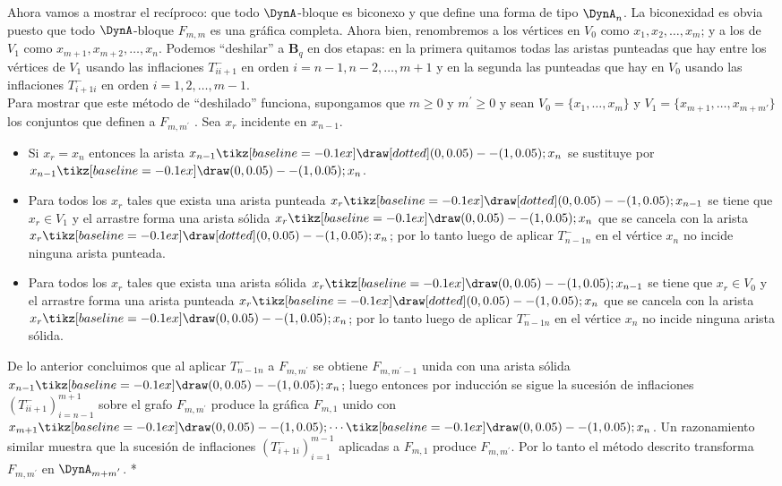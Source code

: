 \newpage
Ahora vamos a mostrar el recíproco: que todo $\DynA$-bloque es biconexo y que define una forma de tipo $\DynA_{n}$. La biconexidad es obvia puesto que todo $\DynA$-bloque $F_{m, m}$ es una gráfica completa. Ahora bien, renombremos a los vértices en $V_{0}$ como $x_{1}, x_{2}, \ldots, x_{m}$; y a los de $V_{1}$ como $x_{m+1}, x_{m+2}, \ldots, x_{n}$. Podemos “deshilar” a $\textbf{B}_{q}$ en dos etapas: en la primera quitamos todas las aristas punteadas que hay entre los vértices de $V_{1}$ usando las inflaciones $T_{i i+1}^{-}$ en orden $i = n-1, n-2, \ldots, m+1$ y en la segunda las punteadas que hay en $V_{0}$ usando las inflaciones $T_{i+1 i}^{-}$ en orden $i = 1, 2, \dots, m-1$.\\
Para mostrar que este método de “deshilado” funciona, supongamos que $m \ge 0$ y $m^{'} \ge 0$ y sean $V_{0} = \{x_{1}, \ldots, x_{m}\}$ y $V_{1} = \{x_{m+1}, \ldots, x_{m+m'}\}$ los conjuntos que definen a $F_{m,m^{'}}$ . Sea $x_{r}$ incidente en $x_{n-1}$.
\begin{itemize}
\item Si $x_{r} = x_{n}$ entonces la arista $x_{n-1} \tikz[baseline=-0.1ex]\draw [dotted] (0,0.05) -- (1,0.05); x_{n}$ se sustituye por $x_{n-1} \tikz[baseline=-0.1ex]\draw (0,0.05) -- (1,0.05); x_{n}$.
\item Para todos los $x_{r}$ tales que exista una arista punteada $x_{r} \tikz[baseline=-0.1ex]\draw [dotted] (0,0.05) -- (1,0.05); x_{n-1}$ se tiene que $x_{r} \in V_{1}$ y el arrastre forma una arista sólida $x_{r} \tikz[baseline=-0.1ex]\draw (0,0.05) -- (1,0.05); x_{n}$ que se cancela con la arista $x_{r} \tikz[baseline=-0.1ex]\draw [dotted] (0,0.05) -- (1,0.05); x_{n}$; por lo tanto luego de aplicar $T_{n-1 n}^{-}$ en el vértice $x_{n}$ no incide ninguna arista punteada.
\item Para todos los $x_{r}$ tales que exista una arista sólida $x_{r} \tikz[baseline=-0.1ex]\draw (0,0.05) -- (1,0.05); x_{n-1}$ se tiene que $x_{r} \in V_{0}$ y el arrastre forma una arista punteada $x_{r} \tikz[baseline=-0.1ex]\draw [dotted] (0,0.05) -- (1,0.05); x_{n}$ que se cancela con la arista $x_{r} \tikz[baseline=-0.1ex]\draw (0,0.05) -- (1,0.05); x_{n}$; por lo tanto luego de aplicar $T_{n-1 n}^{-}$ en el vértice $x_{n}$ no incide ninguna arista sólida.
\end{itemize}
De lo anterior concluimos que al aplicar $T_{n-1 n}^{-}$ a $F_{m, m^{'}}$ se obtiene $F_{m, m^{'}-1}$ unida con una arista sólida $x_{n-1} \tikz[baseline=-0.1ex]\draw (0,0.05) -- (1,0.05); x_{n}$; luego entonces por inducción se sigue la sucesión de inflaciones $\left(T_{i i+1}^{-}\right)_{i=n-1}^{m+1}$ sobre el grafo $F_{m,m^{'}}$ produce la gráfica $F_{m,1}$ unido con $x_{m+1} \tikz[baseline=-0.1ex]\draw (0,0.05) -- (1,0.05); \cdots \tikz[baseline=-0.1ex]\draw (0,0.05) -- (1,0.05);  x_{n}$. Un razonamiento similar muestra que la sucesión de inflaciones $\left(T_{i+1 i}^{-}\right)_{i=1}^{m-1}$ aplicadas a $F_{m,1}$ produce $F_{m,m^{'}}$. Por lo tanto el método descrito transforma $F_{m,m^{'}}$ en $\DynA_{m+m^{'}}$. *

